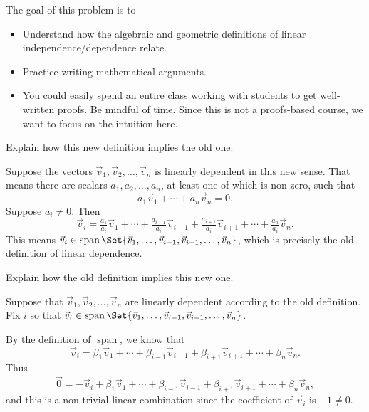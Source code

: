 \documentclass{problemset}
\DeclareMathOperator{\Span}{span}
\begin{document}
	\question
	\begin{annotation}
		\begin{goals}

			The goal of this problem is to
			\begin{itemize}
				\item Understand how the algebraic and geometric definitions of linear
					independence/dependence relate.
				\item Practice writing mathematical arguments.
			\end{itemize}
		\end{goals}

		\begin{notes}
			\begin{itemize}
				\item You could easily spend an entire class working with students
					to get well-written proofs. Be mindful of time. Since
					this is not a proofs-based course, we want to focus on the intuition here.
			\end{itemize}
		\end{notes}
	\end{annotation}
	\begin{parts}
		\item Explain how this new definition implies the old one.
			\begin{solution}
				Suppose the vectors $\vec v_1, \vec v_2, \dots, \vec v_n$ is
				linearly dependent in this new sense. That means there are
				scalars	$a_1, a_2, \dots, a_n$, at least one of which is non-zero,
				such that
				\[
					a_1 \vec v_1 + \cdots + a_n \vec v_n = 0.
				\]
				Suppose $a_i\neq 0$. Then
				\[
					\vec v_i = \tfrac{a_1}{a_i}\vec v_1+\cdots +\tfrac{a_{i-1}}{a_i}\vec v_{i-1}
					+\tfrac{a_{i+1}}{a_i}\vec v_{i+1}+\cdots+\tfrac{a_n}{a_i}\vec v_n.
				\]
				This means $\vec v_i\in \Span\Set{\vec v_1,\ldots,\vec v_{i-1},\vec v_{i+1},\ldots,\vec v_n}$,
				which is precisely the old definition of linear dependence.
			\end{solution}
		\item Explain how the old definition implies this new one.
			\begin{solution}
				Suppose that $\vec v_1, \vec v_2, \dots, \vec v_n$ are linearly
				dependent according to the old definition. Fix $i$ so that
				$\vec v_i\in \Span\Set{\vec v_1,\ldots,\vec v_{i-1},\vec v_{i+1},\ldots,\vec v_n}$.

				By the definition of $\Span$, we know that
				\[
					\vec v_i=\beta_1\vec v_1+\cdots +\beta_{i-1}\vec v_{i-1}+\beta_{i+1}\vec v_{i+1}
					+\cdots +\beta_n\vec v_{n}.
				\]
				Thus
				\[
					\vec 0 = -\vec v_i+\beta_1\vec v_1+\cdots +\beta_{i-1}\vec v_{i-1}+\beta_{i+1}\vec v_{i+1}
					+\cdots +\beta_n\vec v_{n},
				\]
				and this is a non-trivial linear combination since the coefficient of $\vec v_i$ is $-1\neq 0$.
			\end{solution}
	\end{parts}
\end{document}
